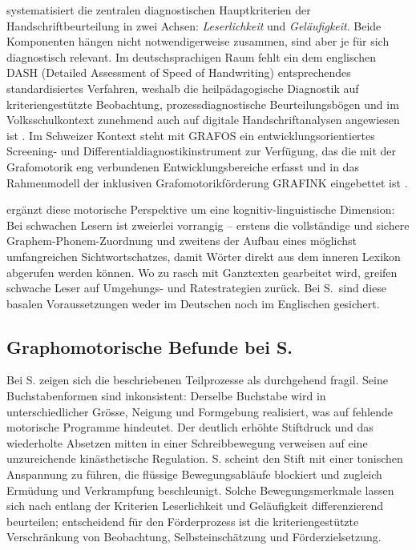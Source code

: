 \documentclass[ngerman, a4paper]{article}
\begin{document}
\textcite[S.\,3,\,11]{hurschler2020handschriftbeurteilung} systematisiert die zentralen
diagnostischen Hauptkriterien der Handschriftbeurteilung in zwei Achsen:
\textit{Leserlichkeit} und \textit{Geläufigkeit}. Beide Komponenten hängen
nicht notwendigerweise zusammen, sind aber je für sich diagnostisch relevant.
Im deutschsprachigen Raum fehlt ein dem englischen DASH (Detailed Assessment
of Speed of Handwriting) entsprechendes standardisiertes Verfahren, weshalb
die heilpädagogische Diagnostik auf kriteriengestützte Beobachtung,
prozessdiagnostische Beurteilungsbögen und im Volksschulkontext zunehmend
auch auf digitale Handschriftanalysen angewiesen ist
\parencite[S.\,11]{hurschler2020handschriftbeurteilung}. Im Schweizer Kontext
steht mit GRAFOS \parencite{saegessereckhart2016grafos} ein
entwicklungsorientiertes Screening- und Differentialdiagnostikinstrument zur
Verfügung, das die mit der Grafomotorik eng verbundenen Entwicklungsbereiche
erfasst und in das Rahmenmodell der inklusiven Grafomotorikförderung GRAFINK
eingebettet ist \parencite[S.\,7,\,11]{saegesserwyss2021grafinkrahmenmodell}.

\textcite[S.\,62]{gold2018lesenkannmanlernen} ergänzt diese motorische Perspektive
um eine kognitiv-linguistische Dimension: Bei schwachen Lesern ist zweierlei
vorrangig -- erstens die vollständige und sichere Graphem-Phonem-Zuordnung und
zweitens der Aufbau eines möglichst umfangreichen Sichtwortschatzes, damit Wörter
direkt aus dem inneren Lexikon abgerufen werden können. Wo zu rasch mit
Ganztexten gearbeitet wird, greifen schwache Leser auf Umgehungs- und
Ratestrategien zurück. Bei S.\ sind diese basalen Voraussetzungen weder im
Deutschen noch im Englischen gesichert.

\subsection{Graphomotorische Befunde bei S.}

Bei S. zeigen sich die beschriebenen Teilprozesse als durchgehend fragil. Seine
Buchstabenformen sind inkonsistent: Derselbe Buchstabe wird in unterschiedlicher Grösse,
Neigung und Formgebung realisiert, was auf fehlende motorische Programme hindeutet. Der
deutlich erhöhte Stiftdruck und das wiederholte Absetzen mitten in einer Schreibbewegung
verweisen auf eine unzureichende kinästhetische Regulation. S. scheint den Stift mit einer
tonischen Anspannung zu führen, die flüssige Bewegungsabläufe blockiert und zugleich
Ermüdung und Verkrampfung beschleunigt. Solche Bewegungsmerkmale lassen sich
nach \textcite[S.\,3,\,11]{hurschler2020handschriftbeurteilung} entlang der
Kriterien Leserlichkeit und Geläufigkeit differenzierend beurteilen;
entscheidend für den Förderprozess ist die kriteriengestützte Verschränkung
von Beobachtung, Selbsteinschätzung und Förderzielsetzung.
\end{document}
